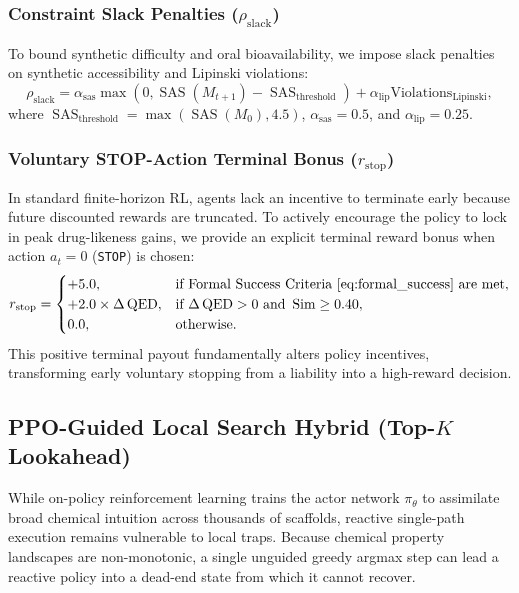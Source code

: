 \documentclass{ieeeaccess}
\begin{document}
\subsubsection{Constraint Slack Penalties ($\rho_{\text{slack}}$)}
To bound synthetic difficulty and oral bioavailability, we impose slack penalties on synthetic accessibility and Lipinski violations:
\begin{equation}
\rho_{\text{slack}} = \alpha_{\text{sas}} \max\left(0, \operatorname{SAS}(M_{t+1}) - \operatorname{SAS}_{\text{threshold}}\right) + \alpha_{\text{lip}} \text{Violations}_{\text{Lipinski}},
\label{eq:slack_penalty}
\end{equation}
where $\operatorname{SAS}_{\text{threshold}} = \max(\operatorname{SAS}(M_0), 4.5)$, $\alpha_{\text{sas}} = 0.5$, and $\alpha_{\text{lip}} = 0.25$.

\subsubsection{Voluntary STOP-Action Terminal Bonus ($r_{\text{stop}}$)}
In standard finite-horizon RL, agents lack an incentive to terminate early because future discounted rewards are truncated. To actively encourage the policy to lock in peak drug-likeness gains, we provide an explicit terminal reward bonus when action $a_t = 0$ (\texttt{STOP}) is chosen:
\begin{equation}
r_{\text{stop}} = \begin{cases}
+5.0, & \text{if Formal Success Criteria \eqref{eq:formal_success} are met}, \\
+2.0 \times \Delta\operatorname{QED}, & \text{if } \Delta\operatorname{QED} > 0 \text{ and } \operatorname{Sim} \ge 0.40, \\
0.0, & \text{otherwise}.
\end{cases}
\label{eq:stop_bonus}
\end{equation}
This positive terminal payout fundamentally alters policy incentives, transforming early voluntary stopping from a liability into a high-reward decision.

\subsection{PPO-Guided Local Search Hybrid (Top-$K$ Lookahead)}
While on-policy reinforcement learning trains the actor network $\pi_\theta$ to assimilate broad chemical intuition across thousands of scaffolds, reactive single-path execution remains vulnerable to local traps. Because chemical property landscapes are non-monotonic, a single unguided greedy argmax step can lead a reactive policy into a dead-end state from which it cannot recover.
\end{document}
